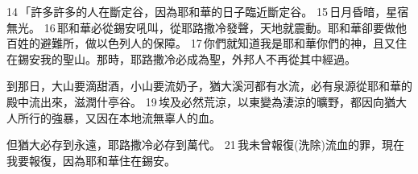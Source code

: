 14 「許多許多的人在斷定谷，因為耶和華的日子臨近斷定谷。 15 日月昏暗，星宿無光。 16 耶和華必從錫安吼叫，從耶路撒冷發聲，天地就震動。耶和華卻要做他百姓的避難所，做以色列人的保障。 17 你們就知道我是耶和華你們的神，且又住在錫安我的聖山。那時，耶路撒冷必成為聖，外邦人不再從其中經過。


到那日，大山要滴甜酒，小山要流奶子，猶大溪河都有水流，必有泉源從耶和華的殿中流出來，滋潤什亭谷。 19 埃及必然荒涼，以東變為淒涼的曠野，都因向猶大人所行的強暴，又因在本地流無辜人的血。


但猶大必存到永遠，耶路撒冷必存到萬代。 21 我未曾報復(洗除)流血的罪，現在我要報復，因為耶和華住在錫安。







